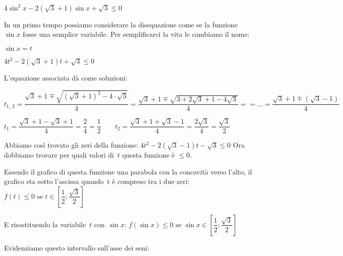  \begin{esempio}
  \(4 \sin^2 x - 2 (\sqrt{3} + 1) \sin x + \sqrt{3} \le 0\)
  
  In un primo tempo possiamo considerare la disequazione come se la funzione 
  \(\sin x\) fosse una semplice variabile.
  Per semplificarci la vita le cambiamo il nome:
  
  \(\sin x = t\)
  
  \(4 t^2 - 2 (\sqrt{3} + 1) t + \sqrt{3} \le 0\)
  
  L'equazione associata dà come soluzioni:
  
  \(t_{1,~2} = 
   \dfrac{\sqrt{3} + 1 \mp \sqrt{(\sqrt{3} + 1)^2 - 4 \cdot \sqrt{3}}}{4} =  
   \dfrac{\sqrt{3} + 1 \mp \sqrt{3 + 2 \sqrt{3} +1 -  4 \sqrt{3}}}{4} = 
   = \dots = \dfrac{\sqrt{3} + 1 \mp (\sqrt{3} -1)}{4}\)

  \(t_{1} = \dfrac{\sqrt{3} + 1 - \sqrt{3} +1}{4} = 
           \dfrac{2}{4} = \dfrac{1}{2} \qquad
   t_{2} = \dfrac{\sqrt{3} + 1 + \sqrt{3} -1}{4} = 
           \dfrac{2 \sqrt{3}}{4} = \dfrac{\sqrt{3}}{2} \)
  
  Abbiamo così trovato gli zeri della funzione: 
  \(4 t^2 - 2 (\sqrt{3} - 1) t - \sqrt{3} \le 0\)
  Ora dobbiamo trovare per quali valori di~\(t\) questa funzione è \(\le 0\).
  
  Essendo il grafico di questa funzione una parabola con la concavità verso 
  l'alto, il grafico sta sotto l'ascissa quando~t è compreso tra i due zeri:
  \(f(t) \le 0 \text{ se } 
        t \in \left[\dfrac{1}{2}; \dfrac{\sqrt{3}}{2} \right]\) 
  
  E risostituendo la variabile~\(t\) con~\(\sin x\):
  \(f(\sin x) \le 0 \text{ se } 
        \sin x \in \left[\dfrac{1}{2}; \dfrac{\sqrt{3}}{2} \right]\) 

  Evidenziamo questo intervallo sull'asse dei seni:
  
 \vspace{-6pt}
  \begin{center}
\begin{inaccessibleblock}
    
\end{inaccessibleblock}
  \end{center}


\end{esempio}
